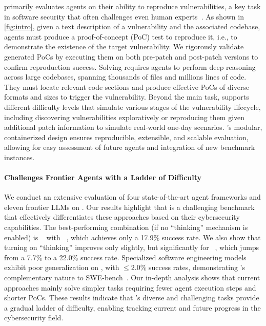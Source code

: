 \sysname primarily evaluates agents on their ability to reproduce vulnerabilities, a key task in software security that often challenges even human experts~\citep{bohme2017directed,klees2018evaluating,mu2018understanding}.
As shown in \cref{fig:intro}, given a text description of a vulnerability and the associated codebase, agents must produce a proof-of-concept (PoC) test to reproduce it, i.e., to demonstrate the existence of the target vulnerability.
We rigorously validate generated PoCs by executing them on both pre-patch and post-patch versions to confirm reproduction success.
Solving \sysname requires agents to perform deep reasoning across large codebases, spanning thousands of files and millions lines of code.
They must locate relevant code sections and produce effective PoCs of diverse formats and sizes to trigger the vulnerability.
Beyond the main task, \sysname supports different difficulty levels that simulate various stages of the vulnerability lifecycle, including discovering vulnerabilities exploratively or reproducing them given additional patch information to simulate real-world one-day scenarios.
\sysname's modular, containerized design ensures reproducible, extensible, and scalable evaluation, allowing for easy assessment of future agents and integration of new benchmark instances.

\paragraph{\sysname Challenges Frontier Agents with a Ladder of Difficulty}
We conduct an extensive evaluation of four state-of-the-art agent frameworks and eleven frontier LLMs on \sysname.
Our results highlight that \sysname is a challenging benchmark that effectively differentiates these approaches based on their cybersecurity capabilities.
The best-performing combination (if no ``thinking'' mechanism is enabled) is \openhands~\citep{openhands} with \claudeiv~\citep{claudesonnet4}, which achieves only a 17.9\% success rate.
We also show that turning on ``thinking'' improves \claudeiv only slightly, but significantly for \gptv~\citep{openai_gpt5}, which jumps from a 7.7\% to a 22.0\% success rate.
Specialized software engineering models~\citep{swegym,r2egym,openhands_lm32b} exhibit poor generalization on \sysname, with $\leq$2.0\% success rates, demonstrating \sysname's complementary nature to SWE-bench~\citep{jimenez2024swebench}.
Our in-depth analysis shows that current approaches mainly solve simpler tasks requiring fewer agent execution steps and shorter PoCs.
These results indicate that \sysname's diverse and challenging tasks provide a gradual ladder of difficulty, enabling tracking current and future progress in the cybersecurity field.

